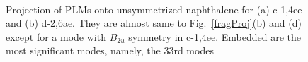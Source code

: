 \begin{figure}[]
\\
\caption{Projection of PLMs onto unsymmetrized naphthalene for (a) c-1,4ee and (b) d-2,6ae.
They are almost same to Fig.~\ref{fragProj}(b) and (d) except for a mode with $B_{2u}$ symmetry in c-1,4ee.
Embedded are the most significant modes, namely, the 33rd modes \label{projNaph}}
\end{figure}


